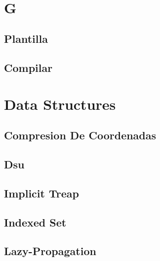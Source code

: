 \documentclass[9pt,portrait,twocolumn,a4paper,notitlepage]{article}
\newcommand\cppfile[2][]{%
\ifstrempty{#1}{}{}%
}
\newcommand\pythonfile[2][]{%
\ifstrempty{#1}{}{}%
}
\begin{document}
\def\title{Universidad Nacional de La Plata - NaN (Need a Name)}
 \\[0.5cm]


\section{G}

\subsection{Plantilla}
\cppfile{general/plantilla.cpp}

\subsection{Compilar}
\pythonfile{general/compilar.sh}


\section{Data Structures}

\subsection{Compresion De Coordenadas}
\cppfile{data_structures_clean/compresion_de_coordenadas.cpp}

\subsection{Dsu}
\cppfile{data_structures_clean/dsu.cpp}

\subsection{Implicit Treap}
\cppfile{data_structures_clean/implicit_treap.cpp}

\subsection{Indexed Set}
\cppfile{data_structures_clean/indexed_set.cpp}

\subsection{Lazy-Propagation}
\cppfile{data_structures_clean/lazy-propagation.cpp}
\end{document}

